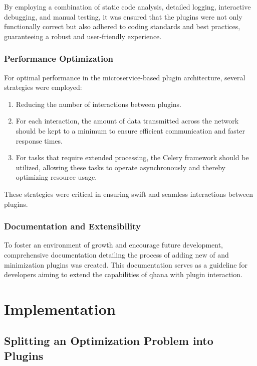 \documentclass[
  a4paper,  %
  twoside,  %
  bibliography=totoc,
  headsepline,
  cleardoublepage=empty,
  parskip=half,
  draft=false
]{scrbook}
\begin{document}
By employing a combination of static code analysis, detailed logging, interactive debugging, and manual testing, it was ensured that the plugins were not only functionally correct but also adhered to coding standards and best practices, guaranteeing a robust and user-friendly experience.


\subsection{Performance Optimization}
For optimal performance in the microservice-based plugin architecture, several strategies were employed:

\begin{enumerate}
    \item Reducing the number of interactions between plugins.
    \item For each interaction, the amount of data transmitted across the network should be kept to a minimum to ensure efficient communication and faster response times.
    \item For tasks that require extended processing, the Celery framework should be utilized, allowing these tasks to operate asynchronously and thereby optimizing resource usage.
\end{enumerate}

These strategies were critical in ensuring swift and seamless interactions between plugins.


\subsection{Documentation and Extensibility}
To foster an environment of growth and encourage future development, comprehensive documentation detailing the process of adding new \gls{of} and minimization plugins was created.
This documentation serves as a guideline for developers aiming to extend the capabilities of \gls{qhana} with plugin interaction.


\chapter{Implementation}
\label{chap:implementation}

\section{Splitting an Optimization Problem into Plugins}
\label{sec:splittingVQAsIntoPlugins}
\end{document}
